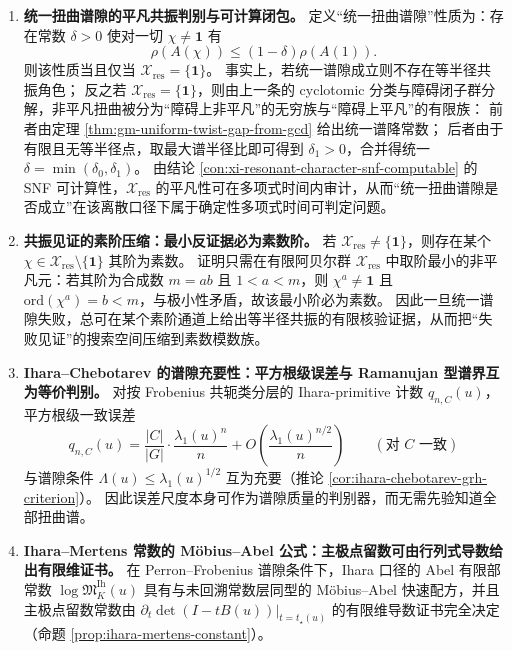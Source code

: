 \begin{enumerate}
  \item \textbf{统一扭曲谱隙的平凡共振判别与可计算闭包。}
  定义“统一扭曲谱隙”性质为：存在常数 \(\delta>0\) 使对一切 \(\chi\neq \mathbf 1\) 有
  \[
  \rho(A(\chi))\le (1-\delta)\rho(A(1)).
  \]
  则该性质当且仅当 \(\mathcal X_{\mathrm{res}}=\{\mathbf 1\}\)。
  事实上，若统一谱隙成立则不存在等半径共振角色；
  反之若 \(\mathcal X_{\mathrm{res}}=\{\mathbf 1\}\)，则由上一条的 cyclotomic 分类与障碍闭子群分解，非平凡扭曲被分为“障碍上非平凡”的无穷族与“障碍上平凡”的有限族：
  前者由定理 \ref{thm:gm-uniform-twist-gap-from-gcd} 给出统一谱降常数；
  后者由于有限且无等半径点，取最大谱半径比即可得到 \(\delta_1>0\)，合并得统一 \(\delta=\min(\delta_0,\delta_1)\)。
  由结论 \ref{con:xi-resonant-character-snf-computable} 的 SNF 可计算性，\(\mathcal X_{\mathrm{res}}\) 的平凡性可在多项式时间内审计，从而“统一扭曲谱隙是否成立”在该离散口径下属于确定性多项式时间可判定问题。

  \item \textbf{共振见证的素阶压缩：最小反证据必为素数阶。}
  若 \(\mathcal X_{\mathrm{res}}\neq\{\mathbf 1\}\)，则存在某个 \(\chi\in\mathcal X_{\mathrm{res}}\setminus\{\mathbf 1\}\) 其阶为素数。
  证明只需在有限阿贝尔群 \(\mathcal X_{\mathrm{res}}\) 中取阶最小的非平凡元：若其阶为合成数 \(m=ab\) 且 \(1<a<m\)，则 \(\chi^a\neq \mathbf 1\) 且 \(\mathrm{ord}(\chi^a)=b<m\)，与极小性矛盾，故该最小阶必为素数。
  因此一旦统一谱隙失败，总可在某个素阶通道上给出等半径共振的有限核验证据，从而把“失败见证”的搜索空间压缩到素数模数族。

  \item \textbf{Ihara--Chebotarev 的谱隙充要性：平方根级误差与 Ramanujan 型谱界互为等价判别。}
  对按 Frobenius 共轭类分层的 Ihara-primitive 计数 \(q_{n,C}(u)\)，平方根级一致误差
  \[
  q_{n,C}(u)=\frac{|C|}{|G|}\cdot\frac{\lambda_1(u)^n}{n}
  +O\!\left(\frac{\lambda_1(u)^{n/2}}{n}\right)
  \qquad(\text{对 }C\text{ 一致})
  \]
  与谱隙条件 \(\Lambda(u)\le \lambda_1(u)^{1/2}\) 互为充要（推论 \ref{cor:ihara-chebotarev-grh-criterion}）。
  因此误差尺度本身可作为谱隙质量的判别器，而无需先验知道全部扭曲谱。

  \item \textbf{Ihara--Mertens 常数的 Möbius--Abel 公式：主极点留数可由行列式导数给出有限维证书。}
  在 Perron--Frobenius 谱隙条件下，Ihara 口径的 Abel 有限部常数 \(\log\mathfrak{M}^{\mathrm{Ih}}_K(u)\) 具有与未回溯常数层同型的 Möbius--Abel 快速配方，并且主极点留数常数由
  \(
  \partial_t\det(I-tB(u))|_{t=t_\star(u)}
  \)
  的有限维导数证书完全决定（命题 \ref{prop:ihara-mertens-constant}）。


\end{enumerate}
